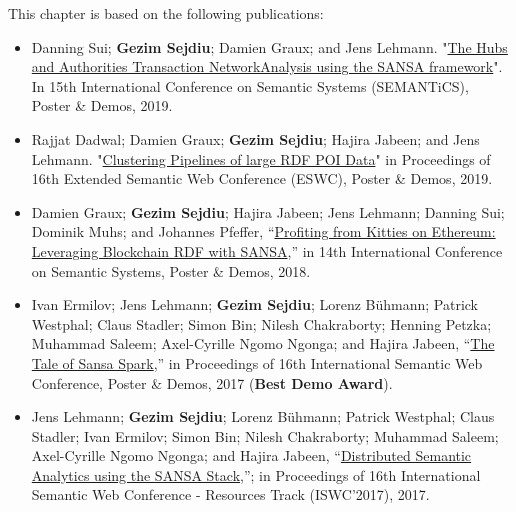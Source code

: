 This chapter is based on the following publications:
\begin{itemize}


   \item Danning Sui; \textbf{Gezim Sejdiu}; Damien Graux; and Jens Lehmann. "\href{https://gezimsejdiu.github.io/publications/sansa-hubs-and-authorities-transaction-semantics19-poster.pdf}{The Hubs and Authorities Transaction NetworkAnalysis using the SANSA framework}".  In 15th International Conference on Semantic Systems (SEMANTiCS), Poster \& Demos, 2019.
   
    \item Rajjat Dadwal; Damien Graux; \textbf{Gezim Sejdiu}; Hajira Jabeen; and Jens Lehmann. "\href{https://gezimsejdiu.github.io/publications/piping-clustering-eswc19-poster.pdf}{Clustering Pipelines of large RDF POI Data}" in Proceedings of 16th Extended Semantic Web Conference (ESWC), Poster \& Demos, 2019.
   
   \item Damien Graux; \textbf{Gezim Sejdiu}; Hajira Jabeen; Jens Lehmann; Danning Sui; Dominik Muhs; and Johannes Pfeffer, “\href{http://jens-lehmann.org/files/2018/semantics_ethereum_pd.pdf}{Profiting from Kitties on Ethereum: Leveraging Blockchain RDF with SANSA},” in 14th International Conference on Semantic Systems, Poster \& Demos, 2018.
    
    \item Ivan Ermilov; Jens Lehmann; \textbf{Gezim Sejdiu}; Lorenz Bühmann; Patrick Westphal; Claus Stadler; Simon Bin; Nilesh Chakraborty; Henning Petzka; Muhammad Saleem; Axel-Cyrille Ngomo Ngonga; and Hajira Jabeen, “\href{http://jens-lehmann.org/files/2017/iswc_pd_sansa.pdf}{The Tale of Sansa Spark},” in Proceedings of 16th International Semantic Web Conference, Poster \& Demos, 2017 ({\color{darkred}\textbf{Best Demo Award}}).
  
    \item Jens Lehmann; \textbf{Gezim Sejdiu}; Lorenz Bühmann; Patrick Westphal; Claus Stadler; Ivan Ermilov; Simon Bin; Nilesh Chakraborty; Muhammad Saleem; Axel-Cyrille Ngomo Ngonga; and Hajira Jabeen, “\href{http://svn.aksw.org/papers/2017/ISWC_SANSA_SoftwareFramework/public.pdf}{Distributed Semantic Analytics using the SANSA Stack},”; in Proceedings of 16th International Semantic Web Conference - Resources Track (ISWC’2017), 2017.


\end{itemize}
